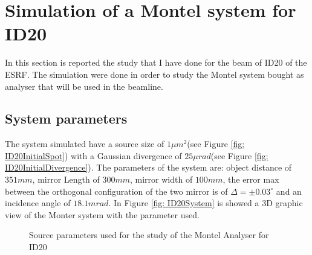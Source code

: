 \section{Simulation of a Montel system for ID20}

In this section is reported the study that I have done for the beam of ID20 of the ESRF. The simulation were done in order to study the Montel system bought as analyser that will be used in the beamline.

\subsection{System parameters}
The system simulated have a source size of $ 1 \mu m^2 $(see Figure \ref{fig: ID20InitialSpot}) with a Gaussian divergence of $25 \mu rad $(see Figure \ref{fig: ID20InitialDivergence}). The parameters of the system are: object distance of $351 mm$, mirror Length of $300mm$, mirror width of $100mm $, the error max between the orthogonal configuration of the two mirror is of $\Delta =  \pm 0.03^{\circ} $ and an incidence angle of $18.1 mrad $. In Figure \ref{fig: ID20System} is showed a 3D graphic view of the Monter system with the parameter used.
\begin{figure}[H]
%
\centering
%
%
\quad
%
\caption{Source parameters used for the study of the Montel Analyser for ID20}
%
\end{figure}

